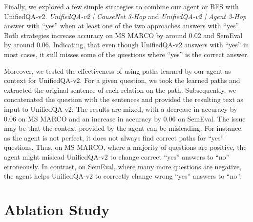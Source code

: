 Finally, we explored a few simple strategies to combine our agent or BFS with UnifiedQA-v2.
\textit{UnifiedQA-v2 | CauseNet 3-Hop} and \textit{UnifiedQA-v2 | Agent 3-Hop} answer with ``yes'' when at least one of the two approaches answers with ``yes''.
Both strategies increase accuracy on MS MARCO by around 0.02 and SemEval by around 0.06.
Indicating, that even though UnifiedQA-v2 answers with ``yes'' in most cases, it still misses some of the questions 
where ``yes'' is the correct answer.

Moreover, we tested the effectiveness of using paths learned by our agent as context for UnifiedQA-v2.
For a given question, we took the learned paths and extracted the original sentence of each relation on the path.
Subsequently, we concatenated the question with the sentences and provided the resulting text as input to UnifiedQA-v2.
The results are mixed, with a decrease in accuracy by 0.06 on MS MARCO and an increase in accuracy by 0.06 on SemEval.
The issue may be that the context provided by the agent can be misleading. For instance, as the agent is not perfect, it does not always find 
correct paths for ``yes'' questions. Thus, on MS MARCO, where a majority of questions are positive, the agent 
might mislead UnifiedQA-v2 to change correct ``yes'' answers to ``no'' erroneously. In contrast, on SemEval, where many more questions 
are negative, the agent helps UnifiedQA-v2 to correctly change wrong ``yes'' answers to ``no''.


%


\section{Ablation Study}
\label{sec:ablation-study}

